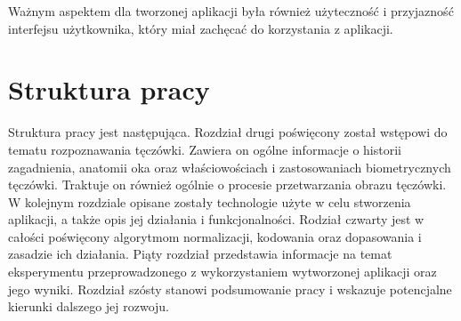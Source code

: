 \noindent
Ważnym aspektem dla tworzonej aplikacji była również użyteczność i przyjazność interfejsu użytkownika,
który miał zachęcać do korzystania z aplikacji.

\section{Struktura pracy}

Struktura pracy jest następująca. Rozdział drugi poświęcony został wstępowi do tematu
rozpoznawania tęczówki. Zawiera on ogólne informacje o historii zagadnienia, anatomii oka oraz właściowościach
i zastosowaniach biometrycznych tęczówki. Traktuje on również ogólnie o procesie
przetwarzania obrazu tęczówki. W kolejnym rozdziale opisane zostały technologie użyte w celu stworzenia
aplikacji, a także opis jej działania i funkcjonalności. Rodział czwarty jest w całości poświęcony
algorytmom normalizacji, kodowania oraz dopasowania i zasadzie ich działania. Piąty rozdział
przedstawia informacje na temat eksperymentu przeprowadzonego z wykorzystaniem wytworzonej
aplikacji oraz jego wyniki. Rozdział szósty stanowi podsumowanie pracy i wskazuje potencjalne
kierunki dalszego jej rozwoju.

